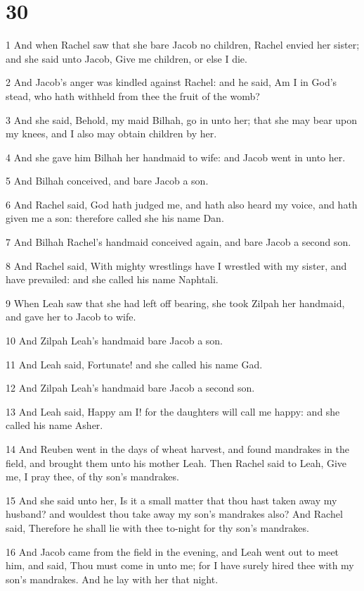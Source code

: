\chapter{30}

\par 1 And when Rachel saw that she bare Jacob no children, Rachel envied her sister; and she said unto Jacob, Give me children, or else I die.
\par 2 And Jacob's anger was kindled against Rachel: and he said, Am I in God's stead, who hath withheld from thee the fruit of the womb?
\par 3 And she said, Behold, my maid Bilhah, go in unto her; that she may bear upon my knees, and I also may obtain children by her.
\par 4 And she gave him Bilhah her handmaid to wife: and Jacob went in unto her.
\par 5 And Bilhah conceived, and bare Jacob a son.
\par 6 And Rachel said, God hath judged me, and hath also heard my voice, and hath given me a son: therefore called she his name Dan.
\par 7 And Bilhah Rachel's handmaid conceived again, and bare Jacob a second son.
\par 8 And Rachel said, With mighty wrestlings have I wrestled with my sister, and have prevailed: and she called his name Naphtali.
\par 9 When Leah saw that she had left off bearing, she took Zilpah her handmaid, and gave her to Jacob to wife.
\par 10 And Zilpah Leah's handmaid bare Jacob a son.
\par 11 And Leah said, Fortunate! and she called his name Gad.
\par 12 And Zilpah Leah's handmaid bare Jacob a second son.
\par 13 And Leah said, Happy am I! for the daughters will call me happy: and she called his name Asher.
\par 14 And Reuben went in the days of wheat harvest, and found mandrakes in the field, and brought them unto his mother Leah. Then Rachel said to Leah, Give me, I pray thee, of thy son's mandrakes.
\par 15 And she said unto her, Is it a small matter that thou hast taken away my husband? and wouldest thou take away my son's mandrakes also? And Rachel said, Therefore he shall lie with thee to-night for thy son's mandrakes.
\par 16 And Jacob came from the field in the evening, and Leah went out to meet him, and said, Thou must come in unto me; for I have surely hired thee with my son's mandrakes. And he lay with her that night.
